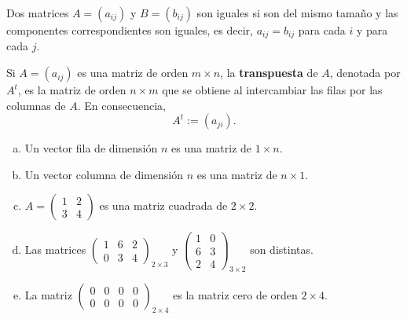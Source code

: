 Dos matrices $A=(a_{ij})$ y $B=(b_{ij})$ son iguales si son del mismo tamaño y las componentes correspondientes son iguales, es decir, $a_{ij}=b_{ij}$ para cada $i$ y para cada $j$.

Si $A = (a_{i j})$ es una matriz de orden $m \times n$, la \textbf{transpuesta} de $A$, denotada por $A^t$,
es la matriz de orden $n \times m$ que se obtiene al intercambiar las filas por las columnas
de $A$. En consecuencia, 
\[A^t := (a_{j i }).\]

\begin{ejem}
\begin{enumerate}[(a)]
    \item Un vector fila de dimensi\'on $n$ es una matriz de $1\times n$.
    \item Un vector columna de dimensi\'on $n$ es una matriz de $n\times 1$.
    \item $A=\left(\begin{array}{cc}{} 1 & 2\\ 3 & 4 \end{array}\right)$ es una matriz cuadrada de $2\times 2$.
    \item Las matrices $\begin{pmatrix}1& 6& 2 \\0&3&4\end{pmatrix}_{2\times 3}$ y $\left(\begin{array}{cc}
   1& 0 \\
    6&3\\
    2& 4
\end{array}\right)_{3\times 2}$ son distintas.
    \item La matriz $\begin{pmatrix}
   0& 0& 0& 0 \\
   0&0&0& 0
\end{pmatrix}_{2\times 4}$ es la matriz cero de orden $2\times 4$.
\end{enumerate}
\end{ejem}

